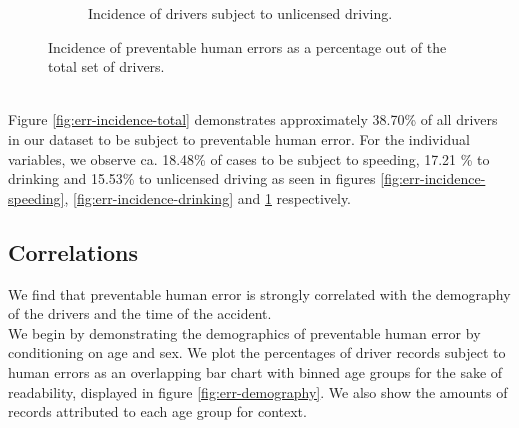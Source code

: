 \documentclass{article}
\theoremstyle{plain}
\theoremstyle{definition}
\theoremstyle{remark}
\begin{document}
\begin{figure}[ht]
\begin{subfigure}[ht]{0.49\columnwidth}
			\caption{Incidence of drivers subject to unlicensed driving.}
			\label{fig:err-incidence-license}
		\end{subfigure}
	\caption{Incidence of preventable human errors as a percentage out of the total set of drivers.}
	\label{fig:incidence}
	\vskip 0.2in
\end{figure}
\\
Figure \ref{fig:err-incidence-total} demonstrates approximately 38.70\% of all drivers in our dataset to be subject to preventable human error. For the individual variables, we observe ca. 18.48\% of cases to be subject to speeding, 17.21 \% to drinking and 15.53\% to unlicensed driving as seen in figures \ref{fig:err-incidence-speeding}, \ref{fig:err-incidence-drinking} and \ref{fig:err-incidence-license} respectively.

\subsection{Correlations}
We find that preventable human error is strongly correlated with the demography of the drivers and the time of the accident.
\\
We begin by demonstrating the demographics of preventable human error by conditioning on age and sex. We plot the percentages of driver records subject to human errors as an overlapping bar chart with binned age groups for the sake of readability, displayed in figure \ref{fig:err-demography}. We also show the amounts of records attributed to each age group for context.
\end{document}
